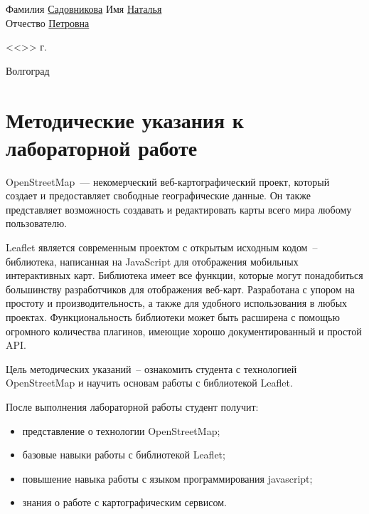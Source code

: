 \documentclass[a4paper, 14pt]{extreport}
\begin{document}
\begin{titlepage}
\begin{flushleft}
            Фамилия \underline{Садовникова\hspace{2.1cm}} Имя \underline{Наталья\hspace{3.45cm}}\\
            Отчество \underline{Петровна\hspace{2.8cm}}
        \end{flushleft}
        \vspace{1.5cm}
        \begin{flushright}
            <<\underline{\hspace{1.0cm}}>>\underline{\hspace{4.0cm}} \the\year г.
        \end{flushright}
        \vspace{\fill}
        \begin{center}
            Волгоград \the\year
        \end{center}
    \end{titlepage}
    \tableofcontents
    \onehalfspacing
    \chapter{Методические указания к лабораторной работе}
    OpenStreetMap~--- некомерческий веб-картографический проект, который создает и предоставляет свободные 
    географические данные. Он также представляет возможность создавать и редактировать карты всего мира любому 
    пользователю.

    Leaflet является современным проектом с открытым исходным кодом~-- библиотека, написанная на JavaScript для 
    отображения мобильных интерактивных карт. Библиотека имеет все функции, которые могут понадобиться большинству 
    разработчиков для отображения веб-карт. Разработана с упором на простоту и производительность, а также для удобного
    использования в любых проектах. Функциональность библиотеки может быть расширена с помощью огромного количества 
    плагинов, имеющие хорошо документированный и простой API.

    Цель методических указаний~-- ознакомить студента с технологией \\OpenStreetMap и научить основам работы с 
    библиотекой Leaflet.

    После выполнения лабораторной работы студент получит:
    \begin{itemize}
        \item представление о технологии OpenStreetMap;
        \item базовые навыки работы с библиотекой Leaflet;
        \item повышение навыка работы с языком программирования javascript;
        \item знания о работе с картографическим сервисом.
    \end{itemize}
    
\end{document}
